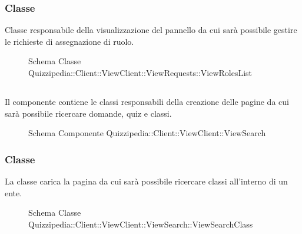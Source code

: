\subsubsection{Classe }
Classe responsabile della visualizzazione del pannello da cui sarà possibile gestire le richieste di assegnazione di ruolo.
\begin{figure}[H]
\centering
\noindent{}
\caption[Schema Classe ViewRolesList]{Schema Classe Quizzipedia::Client::ViewClient::ViewRequests::ViewRolesList}
\end{figure}
\subsection{}
Il componente contiene le classi responsabili della creazione delle pagine da cui sarà possibile ricercare domande, quiz e classi.
\begin{figure}[H]
\centering
\noindent{}
\caption[Schema Componente Quizzipedia::Client::ViewClient::ViewSearch]{Schema Componente Quizzipedia::Client::ViewClient::ViewSearch}
\end{figure}
\subsubsection{Classe }
La classe carica la pagina da cui sarà possibile ricercare classi all'interno di un ente.
\begin{figure}[H]
\centering
\noindent{}
\caption[Schema Classe ViewSearchClass]{Schema Classe Quizzipedia::Client::ViewClient::ViewSearch::ViewSearchClass}
\end{figure}
